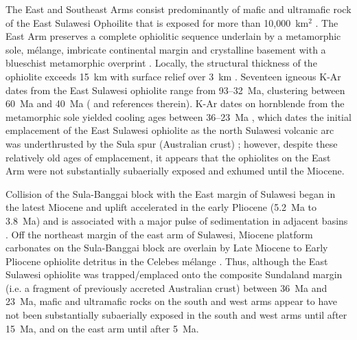 \documentclass[11pt,letterpaper]{article}
\begin{document}
The East and Southeast Arms consist predominantly of mafic and ultramafic rock of the East Sulawesi Ophoilite that is exposed for more than 10,000~km$^{2}$ \citep{Monnier1995a}. The East Arm preserves a complete ophiolitic sequence underlain by a metamorphic sole, m\'elange, imbricate continental margin and crystalline basement with a blueschist metamorphic overprint \citep{Silver1983a, Monnier1995a, Parkinson1998a}. Locally, the structural thickness of the ophiolite exceeds 15~km with surface relief over 3~km \citep{Kadarusman2004a}. Seventeen igneous K-Ar dates from the East Sulawesi ophiolite range from 93--32~Ma, clustering between 60~Ma and 40~Ma (\citealp{Parkinson1998b} and references therein). K-Ar dates on hornblende from the metamorphic sole yielded cooling ages between 36--23~Ma \citep{Parkinson1998a, Villeneuve2001a}, which dates the initial emplacement of the East Sulawesi ophiolite as the north Sulawesi volcanic arc was underthrusted by the Sula spur (Australian crust) \citep{Silver1983a, Parkinson1998a}; however, despite these relatively old ages of emplacement, it appears that the ophiolites on the East Arm were not substantially subaerially exposed and exhumed until the Miocene.  

Collision of the Sula-Banggai block with the East margin of Sulawesi began in the latest Miocene and uplift accelerated in the early Pliocene (5.2~Ma to 3.8~Ma) and is associated with a major pulse of sedimentation in adjacent basins \citep{Davies1990a, Villeneuve2000a}. Off the northeast margin of the east arm of Sulawesi, Miocene platform carbonates on the Sula-Banggai block are overlain by Late Miocene to Early Pliocene ophiolite detritus in the Celebes m\'elange \citep{Davies1990a}. Thus, although the East Sulawesi ophiolite was trapped/emplaced onto the composite Sundaland margin (i.e. a fragment of previously accreted Australian crust) between 36~Ma and 23~Ma, mafic and ultramafic rocks on the south and west arms appear to have not been substantially subaerially exposed in the south and west arms until after 15~Ma, and on the east arm until after 5~Ma.
\end{document}
